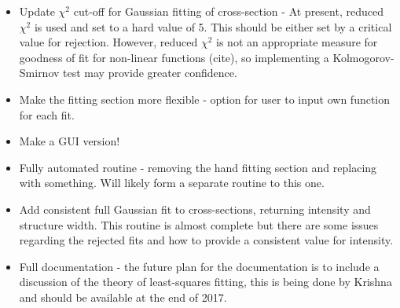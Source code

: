 \documentclass{article}
\begin{document}
\begin{itemize}
\item Update $\chi^2$ cut-off for Gaussian fitting of cross-section - At present, reduced $\chi^2$ is used and set to a hard value of 5. This should be either set by a critical 
value for rejection. However, reduced $\chi^2$ is not an appropriate measure for goodness of fit for non-linear functions (cite), so implementing a Kolmogorov-Smirnov test 
may provide greater confidence.
\item Make the fitting section more flexible - option for user to input own function for each fit.
\item Make a GUI version!
\item Fully automated routine - removing the hand fitting section and replacing with something. Will likely form a separate routine to this one.
\item Add consistent full Gaussian fit to cross-sections, returning intensity and structure width. This routine is almost complete but there are some issues regarding the 
rejected fits and how to provide a consistent value for intensity.
\item Full documentation - the future plan for the documentation is to include a discussion of the theory of least-squares fitting, this is being done by Krishna and should be 
available at the end of 2017.
\end{itemize}
\end{document}
